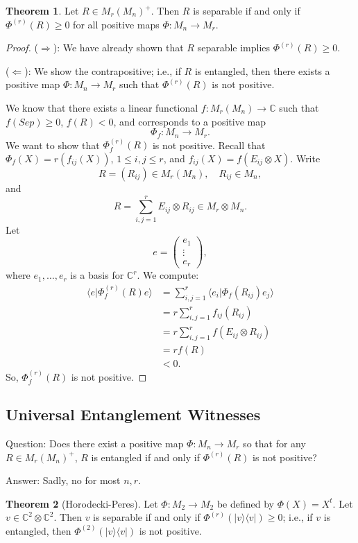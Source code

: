 \documentclass[12pt]{article}
\theoremstyle{definition}
\newtheorem*{theorem}{Theorem}
\newcommand{\C}{\mathbb{C}}
\begin{document}
\begin{theorem}
Let $R \in M_r(M_n)^+$. Then $R$ is separable if and only if $\Phi^{(r)}(R) \geq 0$ for all positive maps $\Phi:M_n \to M_r$.
\end{theorem}

\begin{proof}
($\Rightarrow$): We have already shown that $R$ separable implies $\Phi^{(r)}(R) \geq 0$.

($\Leftarrow$): We show the contrapositive; i.e., if $R$ is entangled, then there exists a positive map $\Phi:M_n \to M_r$ such that $\Phi^{(r)}(R)$ is not positive.

We know that there exists a linear functional $f:M_r(M_n) \to \C$ such that $f(Sep) \geq 0$, $f(R)<0$, and corresponds to a positive map
\[
\Phi_f:M_n \to M_r.
\]
We want to show that $\Phi_f^{(r)}(R)$ is not positive. Recall that $\Phi_f(X)=r(f_{ij}(X))$, $1 \leq i,j \leq r$, and $f_{ij}(X)=f(E_{ij}\otimes X)$. Write
\[
R=(R_{ij}) \in M_r(M_n), \quad R_{ij} \in M_n,
\]
and
\[
R=\sum_{i,j=1}^r E_{ij} \otimes R_{ij} \in M_r \otimes M_n.
\]
Let
\[
e=\begin{pmatrix}e_1\\ \vdots \\ e_r\end{pmatrix},
\]
where $e_1,\ldots,e_r$ is a basis for $\C^r$. We compute:
\begin{align*}
\langle e|\Phi_f^{(r)}(R)e\rangle &= \sum_{i,j=1}^r \langle e_i|\Phi_f(R_{ij})e_j\rangle \\
&= r\sum_{i,j=1}^r f_{ij}(R_{ij}) \\
&= r\sum_{i,j=1}^r f(E_{ij} \otimes R_{ij}) \\
&= rf(R) \\
&< 0.
\end{align*}
So, $\Phi_f^{(r)}(R)$ is not positive.
\end{proof}

\subsection{Universal Entanglement Witnesses}

Question: Does there exist a positive map $\Phi:M_n \to M_r$ so that for any $R \in M_r(M_n)^+$, $R$ is entangled if and only if $\Phi^{(r)}(R)$ is not positive?

Answer: Sadly, no for most $n,r$.

\begin{theorem}[Horodecki-Peres]
Let $\Phi:M_2 \to M_2$ be defined by $\Phi(X)=X^t$. Let $v \in \C^2 \otimes \C^2$. Then $v$ is separable if and only if $\Phi^{(r)}(|v\rangle\langle v|) \geq 0$; i.e., if $v$ is entangled, then $\Phi^{(2)}(|v\rangle\langle v|)$ is not positive.
\end{theorem}
\end{document}
